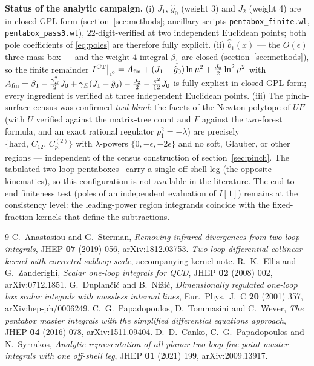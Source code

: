 \documentclass[11pt]{article}
\newcommand{\eps}{\epsilon}
\newcommand{\CT}{\mathrm{CT}}
\begin{document}
\noindent
\textbf{Status of the analytic campaign.}
(i) $J_1$, $\hat g_0$ (weight 3) and $J_2$ (weight 4) are in closed GPL form
(section~\ref{sec:methods}; ancillary scripts \texttt{pentabox\_finite.wl},
\texttt{pentabox\_pass3.wl}), $22$-digit-verified at two independent Euclidean points; both
pole coefficients of \eqref{eq:poles} are therefore fully explicit.
(ii) $\hat b_1(x)$ --- the $O(\eps)$ three-mass box --- and the weight-4 integral $\beta_1$ are
closed (section~\ref{sec:methods}), so the finite remainder
$I^{\CT}\big|_{\eps^0}=A_{\rm fin}+(J_1-\hat g_0)\ln\mu^2+\tfrac{J_0}{2}\ln^2\mu^2$ with
$A_{\rm fin}=\beta_1-\tfrac{\gamma_E^2}{2}J_0+\gamma_E(J_1-\hat g_0)-\tfrac{J_2}{2}
-\tfrac{\pi^2}{12}J_0$ is fully explicit in closed GPL form; every ingredient is verified at
three independent Euclidean points.
(iii) The pinch-surface census was confirmed \emph{tool-blind}: the facets of the Newton
polytope of $UF$ (with $U$ verified against the matrix-tree count and $F$ against the two-forest
formula, and an exact rational regulator $p_1^2=-\lambda$) are precisely
$\{\text{hard},\,C_{12},\,C^{(2)}_{p_1}\}$ with $\lambda$-powers $\{0,-\eps,-2\eps\}$ and no
soft, Glauber, or other regions --- independent of the census construction of
section~\ref{sec:pinch}. The tabulated two-loop pentaboxes~\cite{PTW,CPS} carry a single
off-shell leg (the opposite kinematics), so this configuration is not available in the
literature. The end-to-end finiteness test (poles of an independent evaluation of $I[1]$)
remains at the consistency level: the leading-power region integrands coincide with the
fixed-fraction kernels that define the subtractions.

\begin{thebibliography}{9}
 C.~Anastasiou and G.~Sterman,
\emph{Removing infrared divergences from two-loop integrals},
JHEP \textbf{07} (2019) 056, arXiv:1812.03753.
 \emph{Two-loop differential collinear kernel with corrected subloop scale},
accompanying kernel note.
 R.~K.~Ellis and G.~Zanderighi,
\emph{Scalar one-loop integrals for QCD},
JHEP \textbf{02} (2008) 002, arXiv:0712.1851.
 G.~Duplan\v{c}i\'c and B.~Ni\v{z}i\'c,
\emph{Dimensionally regulated one-loop box scalar integrals with massless internal lines},
Eur.\ Phys.\ J.\ C \textbf{20} (2001) 357, arXiv:hep-ph/0006249.
 C.~G.~Papadopoulos, D.~Tommasini and C.~Wever,
\emph{The pentabox master integrals with the simplified differential equations approach},
JHEP \textbf{04} (2016) 078, arXiv:1511.09404.
 D.~D.~Canko, C.~G.~Papadopoulos and N.~Syrrakos,
\emph{Analytic representation of all planar two-loop five-point master integrals with one
off-shell leg}, JHEP \textbf{01} (2021) 199, arXiv:2009.13917.
\end{thebibliography}
\end{document}
